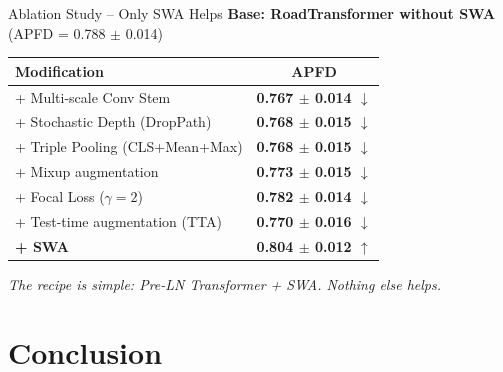 \documentclass[aspectratio=169,10pt]{beamer}
\newcommand{\hlg}[1]{\textcolor{successgreen}{\textbf{#1}}}
\newcommand{\hlr}[1]{\textcolor{alertred}{\textbf{#1}}}
\begin{document}
\begin{frame}{Ablation Study -- Only SWA Helps}
  \textbf{Base: RoadTransformer without SWA} (APFD = 0.788 $\pm$ 0.014)
  \vspace{6pt}

  \begin{center}
  \begin{tabular}{lc}
    \toprule
    \textbf{Modification} & \textbf{APFD} \\
    \midrule
    + Multi-scale Conv Stem       & \hlr{0.767 $\pm$ 0.014 $\downarrow$} \\
    + Stochastic Depth (DropPath) & \hlr{0.768 $\pm$ 0.015 $\downarrow$} \\
    + Triple Pooling (CLS+Mean+Max)& \hlr{0.768 $\pm$ 0.015 $\downarrow$} \\
    + Mixup augmentation          & \hlr{0.773 $\pm$ 0.015 $\downarrow$} \\
    + Focal Loss ($\gamma{=}2$)   & \hlr{0.782 $\pm$ 0.014 $\downarrow$} \\
    + Test-time augmentation (TTA)& \hlr{0.770 $\pm$ 0.016 $\downarrow$} \\
    \rowcolor{mLightBrown!20}
    \textbf{+ SWA}                & \hlg{\textbf{0.804 $\pm$ 0.012 $\uparrow$}} \\
    \bottomrule
  \end{tabular}
  \end{center}

  \vspace{4pt}
  {\small \textit{The recipe is simple: Pre-LN Transformer + SWA. Nothing else helps.}}
\end{frame}

\section{Conclusion}
\end{document}
